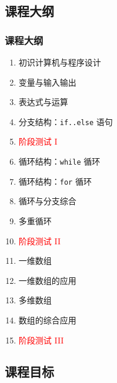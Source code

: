 \subsection{课程大纲}

\begin{frame}[fragile]
    \frametitle{课程大纲}

    \begin{multicols}{2}
        \begin{enumerate}
            \item<1-> 初识计算机与程序设计
            \item<1-> 变量与输入输出
            \item<1-> 表达式与运算
            \item<1-> 分支结构：\lstinline|if..else| 语句
            \item<1-> \textcolor{red}{阶段测试 I}
            \item<2-> 循环结构：\lstinline|while| 循环
            \item<2-> 循环结构：\lstinline|for| 循环
            \item<2-> 循环与分支综合
            \item<2-> 多重循环
            \item<2-> \textcolor{red}{阶段测试 II}
            \item<3-> 一维数组
            \item<3-> 一维数组的应用
            \item<3-> 多维数组
            \item<3-> 数组的综合应用
            \item<3-> \textcolor{red}{阶段测试 III}
        \end{enumerate}
    \end{multicols}
\end{frame}

\subsection{课程目标}

